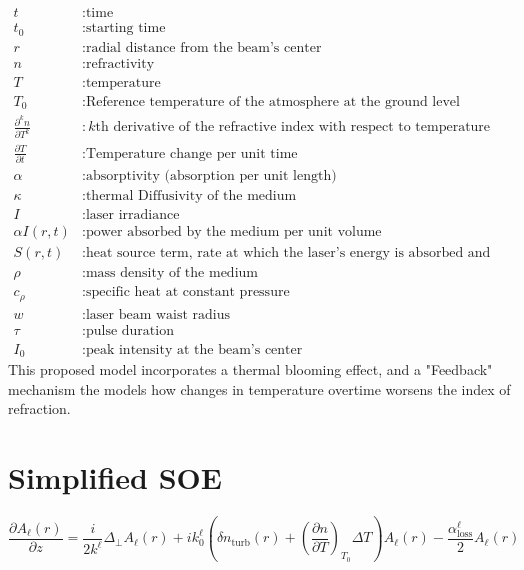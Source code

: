 \documentclass[a4paper, 12pt]{amsbook}
\begin{document}
\begin{equation*}
    \begin{aligned}
        t &: \text{time} \\
        t_0 &: \text{starting time} \\
        r &: \text{radial distance from the beam's center} \\
        n&: \text{refractivity} \\
        T&: \text{temperature} \\
        T_0 &: \text{Reference temperature of the atmosphere at the ground level} \\
        \frac{\partial^k n}{\partial T^k} &: \text{$k$th derivative of the refractive index with respect to temperature} \\
        \frac{\partial T}{\partial t} &: \text{Temperature change per unit time} \\
        \alpha&: \text{absorptivity (absorption per unit length)} \\
        \kappa &: \text{thermal Diffusivity of the medium}\\
        I&: \text{laser irradiance}  \\
        \alpha I(r,t) &: \text{power absorbed by the medium per unit volume} \\
        S(r,t) &: \text{heat source term, rate at which the laser's energy is absorbed and converted into heat}\\
        \rho &: \text{mass density of the medium} \\
        c_\rho &: \text{specific heat at constant pressure} \\
        w &: \text{laser beam waist radius} \\
        \tau &: \text{pulse duration} \\
        I_0 &: \text{peak intensity at the beam's center}
    \end{aligned}
\end{equation*}
This proposed model incorporates a thermal blooming effect, and a "Feedback" mechanism the models how changes in temperature overtime worsens the index of refraction.


\newpage

\section{Simplified SOE}

$$\frac{\partial A_\ell(r)}{\partial z} = \frac{i}{2k^\ell} \Delta_\perp A_\ell(r) + ik_0^\ell \left( \delta n_{\text{turb}}(r) + \left( \frac{\partial n}{\partial T} \right)_{T_0} \Delta T \right)A_\ell(r)-\frac{\alpha^\ell_\text{loss}}{2} A_\ell(r)$$
\end{document}
